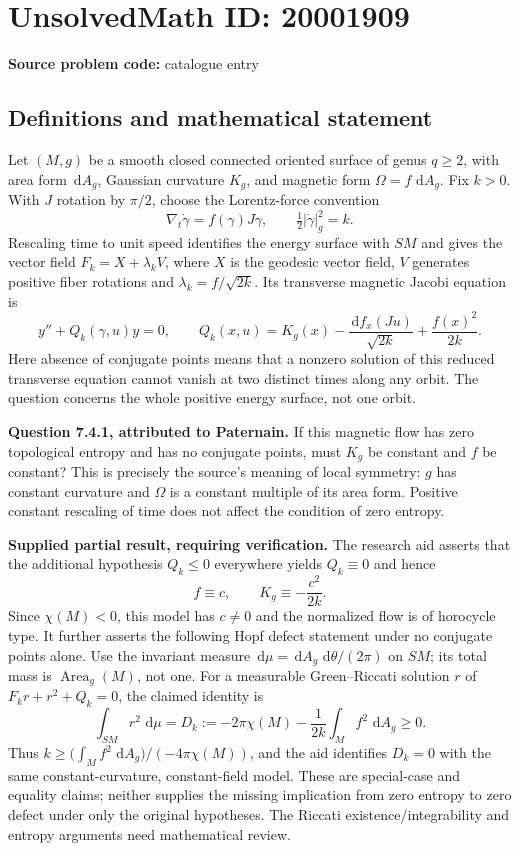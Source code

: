 \documentclass[11pt]{article}
\newcommand{\dd}{\,\mathrm{d}}
\begin{document}
\section*{UnsolvedMath ID: 20001909}
\textbf{Source problem code:} catalogue entry
\subsection{Definitions and mathematical statement}
Let $(M,g)$ be a smooth closed connected oriented surface of genus $q\ge2$, with area form $\dd A_g$, Gaussian curvature $K_g$, and magnetic form $\Omega=f\,\dd A_g$. Fix $k>0$. With $J$ rotation by $\pi/2$, choose the Lorentz-force convention
\[
 \nabla_t\dot\gamma=f(\gamma)J\dot\gamma,
 \qquad \tfrac12|\dot\gamma|_g^2=k.
\]
Rescaling time to unit speed identifies the energy surface with $SM$ and gives the vector field $F_k=X+\lambda_kV$, where $X$ is the geodesic vector field, $V$ generates positive fiber rotations and $\lambda_k=f/\sqrt{2k}$. Its transverse magnetic Jacobi equation is
\[
 y''+Q_k(\gamma,u)y=0,
 \qquad Q_k(x,u)=K_g(x)-\frac{\dd f_x(Ju)}{\sqrt{2k}}
                   +\frac{f(x)^2}{2k}.
\]
Here absence of conjugate points means that a nonzero solution of this reduced transverse equation cannot vanish at two distinct times along any orbit. The question concerns the whole positive energy surface, not one orbit.

\textbf{Question 7.4.1, attributed to Paternain.} If this magnetic flow has zero topological entropy and has no conjugate points, must $K_g$ be constant and $f$ be constant? This is precisely the source's meaning of local symmetry: $g$ has constant curvature and $\Omega$ is a constant multiple of its area form. Positive constant rescaling of time does not affect the condition of zero entropy.

\textbf{Supplied partial result, requiring verification.} The research aid asserts that the additional hypothesis $Q_k\le0$ everywhere yields $Q_k\equiv0$ and hence
\[
 f\equiv c,\qquad K_g\equiv-\frac{c^2}{2k}.
\]
Since $\chi(M)<0$, this model has $c\ne0$ and the normalized flow is of horocycle type. It further asserts the following Hopf defect statement under no conjugate points alone. Use the invariant measure $\dd\mu=\dd A_g\,\dd\theta/(2\pi)$ on $SM$; its total mass is $\operatorname{Area}_g(M)$, not one. For a measurable Green--Riccati solution $r$ of $F_kr+r^2+Q_k=0$, the claimed identity is
\[
 \int_{SM}r^2\,\dd\mu
 =D_k:=-2\pi\chi(M)-\frac1{2k}\int_M f^2\,\dd A_g\ge0.
\]
Thus $k\ge \bigl(\int_M f^2\,\dd A_g\bigr)/(-4\pi\chi(M))$, and the aid identifies $D_k=0$ with the same constant-curvature, constant-field model. These are special-case and equality claims; neither supplies the missing implication from zero entropy to zero defect under only the original hypotheses. The Riccati existence/integrability and entropy arguments need mathematical review.
\end{document}
